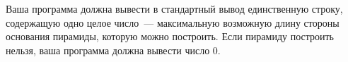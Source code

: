 Ваша программа должна вывести в стандартный вывод единственную строку, содержащую одно
целое число~--- максимальную возможную длину стороны основания пирамиды, которую можно
построить. Если пирамиду построить нельзя, ваша программа должна вывести число $0$. 